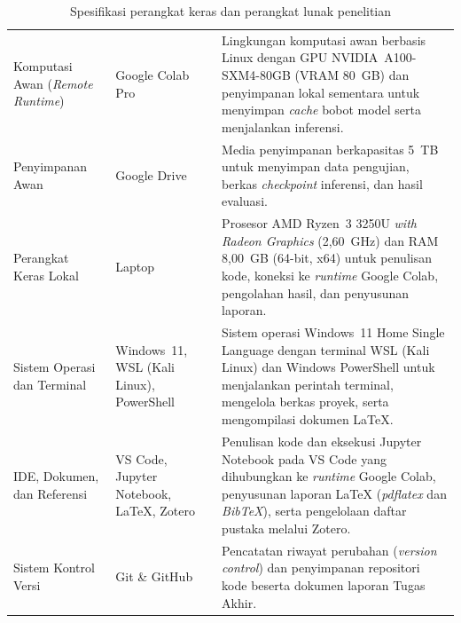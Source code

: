 \begin{table}[H]
  \centering
  {\footnotesize\linespread{1.0}\selectfont
  \let\normalsize\footnotesize
  \setlength{\abovecaptionskip}{0pt}
  \setlength{\belowcaptionskip}{\baselineskip}
  \caption{Spesifikasi perangkat keras dan perangkat lunak penelitian}
  \label{tab:alat_penelitian}
  }
  {\small
  \linespread{1.00}\selectfont
  \renewcommand{\arraystretch}{1.08}
  \setlength{\tabcolsep}{5pt}
  \begin{tabular}{|>{\raggedright\arraybackslash}p{2.55cm}|>{\raggedright\arraybackslash}p{3.15cm}|>{\raggedright\arraybackslash}p{6.95cm}|}
    \hline
    \multicolumn{1}{|>{\centering\arraybackslash}p{2.55cm}|}{\textbf{Kategori}} &
    \multicolumn{1}{>{\centering\arraybackslash}p{3.15cm}|}{\textbf{Komponen}} &
    \multicolumn{1}{>{\centering\arraybackslash}p{6.95cm}|}{\textbf{Spesifikasi dan Kegunaan}} \\
    \hline
    Komputasi Awan (\textit{Remote Runtime}) & Google Colab Pro & Lingkungan komputasi awan berbasis Linux dengan GPU NVIDIA~A100-SXM4-80GB (VRAM 80~GB) dan penyimpanan lokal sementara untuk menyimpan \textit{cache} bobot model serta menjalankan inferensi. \\
    \hline
    Penyimpanan Awan & Google Drive & Media penyimpanan berkapasitas 5~TB untuk menyimpan data pengujian, berkas \textit{checkpoint} inferensi, dan hasil evaluasi. \\
    \hline
    Perangkat Keras Lokal & Laptop & Prosesor AMD Ryzen~3 3250U \textit{with Radeon Graphics} (2,60~GHz) dan RAM 8,00~GB (64-bit, x64) untuk penulisan kode, koneksi ke \textit{runtime} Google Colab, pengolahan hasil, dan penyusunan laporan. \\
    \hline
    Sistem Operasi dan Terminal & Windows~11, WSL (Kali Linux), PowerShell & Sistem operasi Windows~11 Home Single Language dengan terminal WSL (Kali Linux) dan Windows PowerShell untuk menjalankan perintah terminal, mengelola berkas proyek, serta mengompilasi dokumen \LaTeX{}. \\
    \hline
    IDE, Dokumen, dan Referensi & VS Code, Jupyter Notebook, \LaTeX{}, Zotero & Penulisan kode dan eksekusi Jupyter Notebook pada VS Code yang dihubungkan ke \textit{runtime} Google Colab, penyusunan laporan \LaTeX{} (\textit{pdflatex} dan \textit{BibTeX}), serta pengelolaan daftar pustaka melalui Zotero. \\
    \hline
    Sistem Kontrol Versi & Git \& GitHub & Pencatatan riwayat perubahan (\textit{version control}) dan penyimpanan repositori kode beserta dokumen laporan Tugas Akhir. \\

\end{tabular}}
\end{table}
